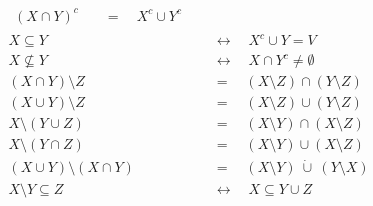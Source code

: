 \begin{align*}
\begin{split}
        (X\cap Y)^c &  \quad = \quad X^c \cup Y^c
    \end{split} \tag{Regeln von De Morgan} \\[0.8em]
    X \subseteq Y & \quad \leftrightarrow\quad X^c \cup Y = V \\
    X \nsubseteq Y & \quad \leftrightarrow\quad X\cap Y^c \neq \emptyset \\[0.8em]
    (X \cap Y) \setminus Z & \quad =\quad(X\setminus Z)\cap (Y\setminus Z) \\
    (X\cup Y)\setminus Z & \quad =\quad (X\setminus Z)\cup (Y\setminus Z) \\
        X \setminus (Y \cup Z) & \quad =\quad (X \setminus Y) \cap (X \setminus Z)\\
        X \setminus (Y \cap Z) & \quad =\quad (X \setminus Y) \cup (X \setminus Z) \\[0.8em]
    (X \cup Y) \setminus (X \cap Y) & \quad =\quad (X \setminus Y) \ \dot\cup\ (Y \setminus X) \tag{symmetrische Differenz} \\
    X\setminus Y \subseteq Z & \quad \leftrightarrow\quad X\subseteq Y\cup Z \tag{„Monus“-Eigenschaft}
\end{align*}
\endgroup




 
